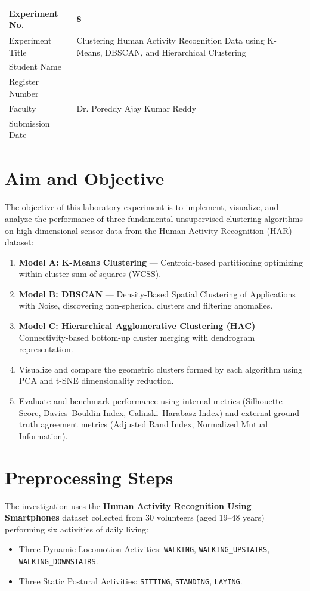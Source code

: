 \documentclass[12pt,a4paper]{article}
\begin{document}
\begin{tabular}{|p{4cm}|p{11.5cm}|}
\hline
Experiment No. & 8 \\ \hline
Experiment Title & Clustering Human Activity Recognition Data using K-Means, DBSCAN, and Hierarchical Clustering \\ \hline
Student Name & \\ \hline
Register Number & \\ \hline
Faculty & Dr. Poreddy Ajay Kumar Reddy \\ \hline
Submission Date & \\ \hline
\end{tabular}

\vspace{0.5cm}

\section{Aim and Objective}
The objective of this laboratory experiment is to implement, visualize, and analyze the performance of three fundamental unsupervised clustering algorithms on high-dimensional sensor data from the Human Activity Recognition (HAR) dataset:
\begin{enumerate}[label=\alph*)]
\item \textbf{Model A: K-Means Clustering} --- Centroid-based partitioning optimizing within-cluster sum of squares (WCSS).
\item \textbf{Model B: DBSCAN} --- Density-Based Spatial Clustering of Applications with Noise, discovering non-spherical clusters and filtering anomalies.
\item \textbf{Model C: Hierarchical Agglomerative Clustering (HAC)} --- Connectivity-based bottom-up cluster merging with dendrogram representation.
\item Visualize and compare the geometric clusters formed by each algorithm using PCA and t-SNE dimensionality reduction.
\item Evaluate and benchmark performance using internal metrics (Silhouette Score, Davies--Bouldin Index, Calinski--Harabasz Index) and external ground-truth agreement metrics (Adjusted Rand Index, Normalized Mutual Information).
\end{enumerate}

\section{Preprocessing Steps}
The investigation uses the \textbf{Human Activity Recognition Using Smartphones} dataset collected from 30 volunteers (aged 19--48 years) performing six activities of daily living:
\begin{itemize}
\item Three Dynamic Locomotion Activities: \texttt{WALKING}, \texttt{WALKING\_UPSTAIRS}, \texttt{WALKING\_DOWNSTAIRS}.
\item Three Static Postural Activities: \texttt{SITTING}, \texttt{STANDING}, \texttt{LAYING}.
\end{itemize}
\end{document}
